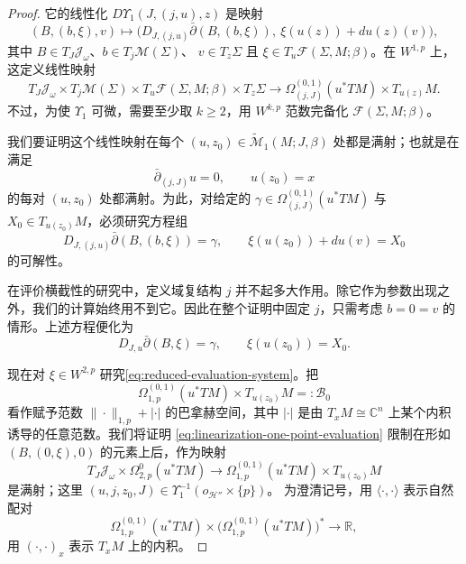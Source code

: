 \begin{proof}
它的线性化
$D\Upsilon_1(J,(j,u),z)$ 是映射
\begin{equation}
 (B,(b,\xi),v)\longmapsto
 \bigl(D_{J,(j,u)}\bar\partial(B,(b,\xi)),
 \ \xi(u(z))+du(z)(v)\bigr),
 \label{eq:linearization-one-point-evaluation}
\end{equation}
其中
$B\in T_J\mathcal J_\omega$、$b\in T_j\mathcal M(\Sigma)$、
$v\in T_z\Sigma$ 且 $\xi\in T_u\mathcal F(\Sigma,M;\beta)$。在
$W^{1,p}$ 上，这定义线性映射
\[
 T_J\mathcal J_\omega\times T_j\mathcal M(\Sigma)
 \times T_u\mathcal F(\Sigma,M;\beta)\times T_z\Sigma
 \longrightarrow
 \Omega_{(j,J)}^{(0,1)}(u^*TM)\times T_{u(z)}M.
\]
不过，为使 $\Upsilon_1$ 可微，需要至少取 $k\geq2$，用
$W^{k,p}$ 范数完备化 $\mathcal F(\Sigma,M;\beta)$。

我们要证明这个线性映射在每个
$(u,z_0)\in\widetilde{\mathcal M}_1(M;J,\beta)$ 处都是满射；也就是在满足
\[
 \bar\partial_{(j,J)}u=0,
 \qquad u(z_0)=x
\]
的每对 $(u,z_0)$ 处都满射。为此，对给定的
$\gamma\in\Omega_{(j,J)}^{(0,1)}(u^*TM)$ 与
$X_0\in T_{u(z_0)}M$，必须研究方程组
\begin{equation}
 D_{J,(j,u)}\bar\partial(B,(b,\xi))=\gamma,
 \qquad \xi(u(z_0))+du(v)=X_0
 \label{eq:evaluation-surjectivity-system}
\end{equation}
的可解性。

在评价横截性的研究中，定义域复结构 $j$ 并不起多大作用。除它作为参数出现之外，我们的计算始终用不到它。因此在整个证明中固定 $j$，只需考虑
$b=0=v$ 的情形。上述方程便化为
\begin{equation}
 D_{J,u}\bar\partial(B,\xi)=\gamma,
 \qquad \xi(u(z_0))=X_0.
 \label{eq:reduced-evaluation-system}
\end{equation}

现在对 $\xi\in W^{2,p}$ 研究\eqref{eq:reduced-evaluation-system}。把
\[
 \Omega_{1,p}^{(0,1)}(u^*TM)\times T_{u(z_0)}M=:\mathcal B_0
\]
看作赋予范数 $\|\cdot\|_{1,p}+|\cdot|$ 的巴拿赫空间，其中
$|\cdot|$ 是由 $T_xM\cong\mathbb C^n$ 上某个内积诱导的任意范数。我们将证明
\eqref{eq:linearization-one-point-evaluation} 限制在形如
$(B,(0,\xi),0)$ 的元素上后，作为映射
\[
 T_J\mathcal J_\omega\times\Omega_{2,p}^0(u^*TM)
 \longrightarrow
 \Omega_{1,p}^{(0,1)}(u^*TM)\times T_{u(z_0)}M
\]
是满射；这里 $(u,j,z_0,J)\in
\Upsilon_1^{-1}(o_{\mathcal H''}\times\{p\})$。
为澄清记号，用 $\langle\cdot,\cdot\rangle$ 表示自然配对
\[
 \Omega_{1,p}^{(0,1)}(u^*TM)\times
 \bigl(\Omega_{1,p}^{(0,1)}(u^*TM)\bigr)^*\longrightarrow\mathbb R,
\]
用 $(\cdot,\cdot)_x$ 表示 $T_xM$ 上的内积。


\end{proof}
